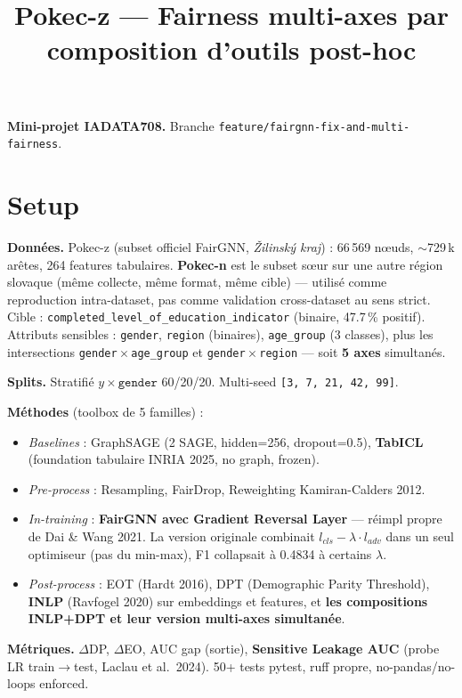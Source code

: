 \documentclass[10pt,a4paper]{article}
\title{\vspace{-2.5em}Pokec-z — Fairness multi-axes par composition d'outils post-hoc}
\author{}
\date{}
\begin{document}
\maketitle\vspace{-3em}

\noindent\textbf{Mini-projet IADATA708.} Branche \texttt{feature/fairgnn-fix-and-multi-fairness}.

\section{Setup}

\textbf{Données.} Pokec-z (subset officiel FairGNN, \textit{Žilinský kraj}) :
66\,569 nœuds, $\sim$729\,k arêtes, 264 features tabulaires.
\textbf{Pokec-n} est le subset sœur sur une autre région slovaque (même
collecte, même format, même cible) — utilisé comme reproduction
intra-dataset, pas comme validation cross-dataset au sens strict.
Cible : \texttt{completed\_level\_of\_education\_indicator}
(binaire, 47.7\,\% positif). Attributs sensibles : \texttt{gender},
\texttt{region} (binaires), \texttt{age\_group} (3 classes), plus les
intersections \texttt{gender}\,$\times$\,\texttt{age\_group} et
\texttt{gender}\,$\times$\,\texttt{region} — soit \textbf{5 axes} simultanés.

\textbf{Splits.} Stratifié $y \times \texttt{gender}$ 60/20/20. Multi-seed
\texttt{[3, 7, 21, 42, 99]}.

\textbf{Méthodes} (toolbox de 5 familles) :
\begin{itemize}
\item \textit{Baselines} : GraphSAGE (2 SAGE, hidden=256, dropout=0.5),
  \textbf{TabICL} (foundation tabulaire INRIA 2025, no graph, frozen).
\item \textit{Pre-process} : Resampling, FairDrop, Reweighting Kamiran-Calders 2012.
\item \textit{In-training} : \textbf{FairGNN avec Gradient Reversal Layer} —
  réimpl propre de Dai \& Wang 2021. La version originale combinait
  $l_{cls} - \lambda \cdot l_{adv}$ dans un seul optimiseur (pas du min-max),
  F1 collapsait à 0.4834 à certains $\lambda$.
\item \textit{Post-process} : EOT (Hardt 2016), DPT (Demographic Parity
  Threshold), \textbf{INLP} (Ravfogel 2020) sur embeddings et features, et
  \textbf{les compositions INLP+DPT et leur version multi-axes simultanée}.
\end{itemize}

\textbf{Métriques.} $\Delta$DP, $\Delta$EO, AUC gap (sortie),
\textbf{Sensitive Leakage AUC} (probe LR train$\to$test, Laclau et al.\ 2024).
50+ tests pytest, ruff propre, no-pandas/no-loops enforced.
\end{document}
